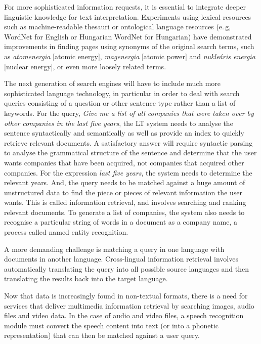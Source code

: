 \begin{multicols}{2}
For more sophisticated information requests, it is essential to integrate deeper linguistic knowledge for text interpretation. Experiments using lexical resources such as machine-readable thesauri or ontological language resources (e.\,g, WordNet for English or Hungarian WordNet for Hungarian) have demonstrated improvements in finding pages using synonyms of the original search terms, such as \textit{atomenergia} [atomic energy], \textit{magenergia} [atomic power] and \textit{nukleáris energia} [nuclear energy], or even more loosely related terms.


The next generation of search engines will have to include much more sophisticated language technology, in particular in order to deal with search queries consisting of a question or other sentence type rather than a list of keywords. For the query, \textit{Give me a list of all companies that were taken over by other companies in the last five years}, the LT system needs to analyse the sentence syntactically and semantically as well as provide an index to quickly retrieve relevant documents. A satisfactory answer will require syntactic parsing to analyse the grammatical structure of the sentence and determine that the user wants companies that have been acquired, not companies that acquired other companies. For the expression \textit{last five years}, the system needs to determine the relevant years. And, the query needs to be matched against a huge amount of unstructured data to find the piece or pieces of relevant information the user wants. This is called information retrieval, and involves searching and ranking relevant documents. To generate a list of companies, the system also needs to recognise a particular string of words in a document as a company name, a process called named entity recognition.

A more demanding challenge is matching a query in one language with documents in another language. Cross-lingual information retrieval involves automatically translating the query into all possible source languages and then translating the results back into the target language. 

Now that data is increasingly found in non-textual formats, there is a need for services that deliver multimedia information retrieval by searching images, audio files and video data. In the case of audio and video files, a speech recognition module must convert the speech content into text (or into a phonetic representation) that can then be matched against a user query.


\end{multicols}

